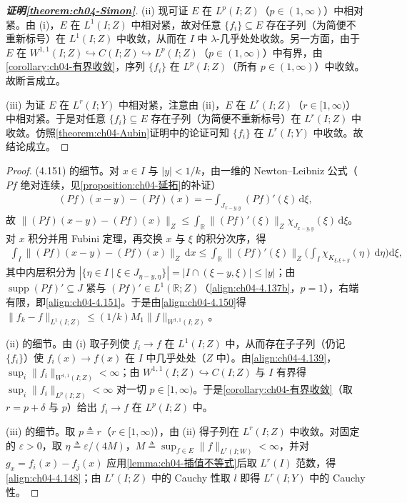 \documentclass[../../main.tex]{subfiles}%
\begin{document}
\begin{proof}[\textbf{证明\cref{theorem:ch04-Simon}}]
(ii) 现可证 $E$ 在 $L^p(I;Z)$（$p\in(1,\infty)$）中相对紧。由 (i)，$E$ 在 $L^1(I;Z)$ 中相对紧，故对任意 $\{f_i\}\subseteq E$ 存在子列（为简便不重新标号）在 $L^1(I;Z)$ 中收敛，从而在 $I$ 中 $\lambda$-几乎处处收敛。另一方面，由于 $E$ 在 $W^{1,1}(I;Z)\hookrightarrow C(I;Z)\hookrightarrow L^p(I;Z)$（$p\in(1,\infty)$）中有界，由\cref{corollary:ch04-有界收敛}，序列 $\{f_i\}$ 在 $L^p(I;Z)$（所有 $p\in(1,\infty)$）中收敛。故断言成立。

(iii) 为证 $E$ 在 $L^r(I;Y)$ 中相对紧，注意由 (ii)，$E$ 在 $L^r(I;Z)$（$r\in[1,\infty)$）中相对紧。于是对任意 $\{f_i\}\subseteq E$ 存在子列（为简便不重新标号）在 $L^r(I;Z)$ 中收敛。仿照\cref{theorem:ch04-Aubin}证明中的论证可知 $\{f_i\}$ 在 $L^r(I;Y)$ 中收敛。故结论成立。
\end{proof}

\begin{proof}
(4.151) 的细节。对 $x\in I$ 与 $|y|<1/k$，由一维的 Newton--Leibniz 公式（$Pf$ 绝对连续，见\cref{proposition:ch04-延拓}的补证）
\begin{align*}
(Pf)(x-y)-(Pf)(x)=-\int_{J_{x-y,y}}(Pf)'(\xi)\,\mathrm{d}\xi ,
\end{align*}
故 $\|(Pf)(x-y)-(Pf)(x)\|_Z\leqslant\int_{\mathbb{R}}\|(Pf)'(\xi)\|_Z\chi_{J_{x-y,y}}(\xi)\,\mathrm{d}\xi$。对 $x$ 积分并用 Fubini 定理，再交换 $x$ 与 $\xi$ 的积分次序，得
\begin{align*}
\int_I\|(Pf)(x-y)-(Pf)(x)\|_Z\,\mathrm{d}x\leqslant\int_{\mathbb{R}}\|(Pf)'(\xi)\|_Z\Big(\int_I\chi_{K_{\xi,\xi+y}}(\eta)\,\mathrm{d}\eta\Big)\mathrm{d}\xi ,
\end{align*}
其中内层积分为 $|\{\eta\in I\mid\xi\in J_{\eta-y,\eta}\}|=|I\cap(\xi-y,\xi)|\leqslant|y|$；由 $\operatorname{supp}(Pf)'\subseteq J$ 紧与 $(Pf)'\in L^1(\mathbb{R};Z)$（\eqref{align:ch04-4.137b}，$p=1$），右端有限，即\eqref{align:ch04-4.151}。于是由\eqref{align:ch04-4.150}得 $\|f_k-f\|_{L^1(I;Z)}\leqslant(1/k)M_1\|f\|_{W^{1,1}(I;Z)}$。

(ii) 的细节。由 (i) 取子列使 $f_i\to f$ 在 $L^1(I;Z)$ 中，从而存在子子列（仍记 $\{f_i\}$）使 $f_i(x)\to f(x)$ 在 $I$ 中几乎处处（$Z$ 中）。由\eqref{align:ch04-4.139}，$\sup_i\|f_i\|_{W^{1,1}(I;Z)}<\infty$；由 $W^{1,1}(I;Z)\hookrightarrow C(I;Z)$ 与 $I$ 有界得 $\sup_i\|f_i\|_{L^p(I;Z)}<\infty$ 对一切 $p\in[1,\infty)$。于是\cref{corollary:ch04-有界收敛}（取 $r=p+\delta$ 与 $p$）给出 $f_i\to f$ 在 $L^p(I;Z)$ 中。

(iii) 的细节。取 $p\triangleq r$（$r\in[1,\infty)$），由 (ii) 得子列在 $L^r(I;Z)$ 中收敛。对固定的 $\varepsilon>0$，取 $\eta\triangleq\varepsilon/(4M)$，$M\triangleq\sup_{f\in E}\|f\|_{L^r(I;W)}<\infty$，并对 $g_x=f_i(x)-f_j(x)$ 应用\cref{lemma:ch04-插值不等式}后取 $L^r(I)$ 范数，得\eqref{align:ch04-4.148}；由 $L^r(I;Z)$ 中的 Cauchy 性取 $l$ 即得 $L^r(I;Y)$ 中的 Cauchy 性。
\end{proof}
\end{document}
